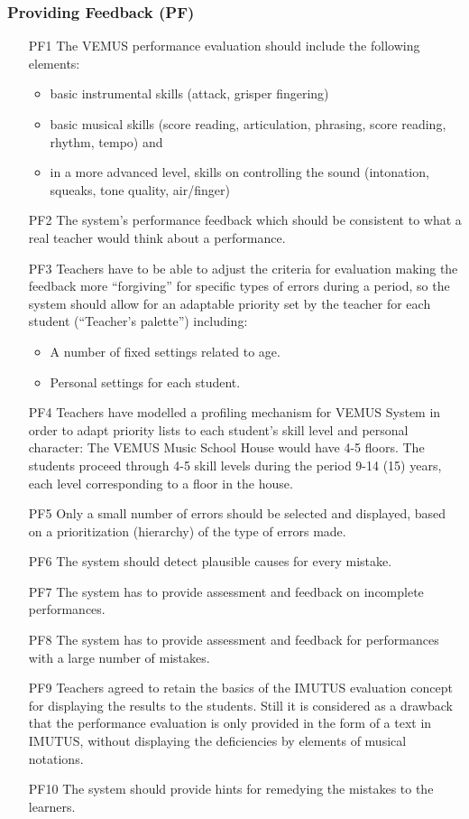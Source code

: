 \subsubsection{Providing Feedback (PF)}
\begin{itemize} \itemsep0em
\item[PF1] The VEMUS performance evaluation should include the following elements:\begin{itemize} \itemsep0em
\item basic instrumental skills (attack, grisper fingering)
\item basic musical skills (score reading, articulation, phrasing, score reading, rhythm, tempo) and
\item in a more advanced level, skills on controlling the sound (intonation, squeaks, tone quality, air/finger)
\end{itemize}

\item[PF2] The system’s performance feedback which should be consistent to what a real teacher would think about a performance.
\item[PF3] Teachers have to be able to adjust the criteria for evaluation making the feedback more “forgiving” for specific types of errors during a period, so the system should allow for an adaptable priority set by the teacher for each student (“Teacher’s palette”) including:\begin{itemize} \itemsep0em
\item A number of fixed settings related to age.
\item Personal settings for each student.
\end{itemize}

\item[PF4] Teachers have modelled a profiling mechanism for VEMUS System in order to adapt priority lists to each student’s skill level and personal character: The VEMUS Music School House would have 4-5 floors. The students proceed through 4-5 skill levels during the period 9-14 (15) years, each level corresponding to a floor in the house.
\item[PF5] Only a small number of errors should be selected and displayed, based on a prioritization (hierarchy) of the type of errors made.
\item[PF6] The system should detect plausible causes for every mistake.
\item[PF7] The system has to provide assessment and feedback on incomplete performances.
\item[PF8] The system has to provide assessment and feedback for performances with a large number of mistakes.
\item[PF9] Teachers agreed to retain the basics of the IMUTUS evaluation concept for displaying the results to the students. Still it is considered as a drawback that the performance evaluation is only provided in the form of a text in IMUTUS, without displaying the deficiencies by elements of musical notations.
\item[PF10] The system should provide hints for remedying the mistakes to the learners.
\end{itemize}


